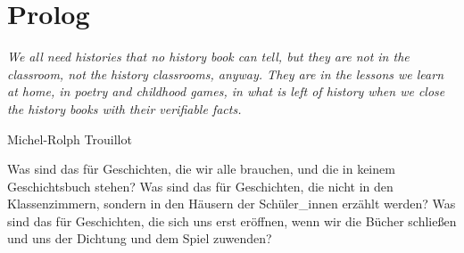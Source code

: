 \section{Prolog}
\epigraph{\textit{ We all need histories that no history book can
  tell, but they are not in the classroom, not the history classrooms, anyway.
  They are in the lessons we learn at home, in poetry and childhood games, in
  what is left of history when we close the history books with their verifiable
facts.}}{Michel-Rolph Trouillot\footnotemark} 

Was sind das für Geschichten, die wir alle brauchen, und die in keinem
Geschichtsbuch stehen? Was sind das für Geschichten, die nicht in den
Klassenzimmern, sondern in den Häusern der Schüler\_innen erzählt werden? Was
sind das für Geschichten, die sich uns erst eröffnen, wenn wir die Bücher
schließen und uns der Dichtung und dem Spiel zuwenden?\\

